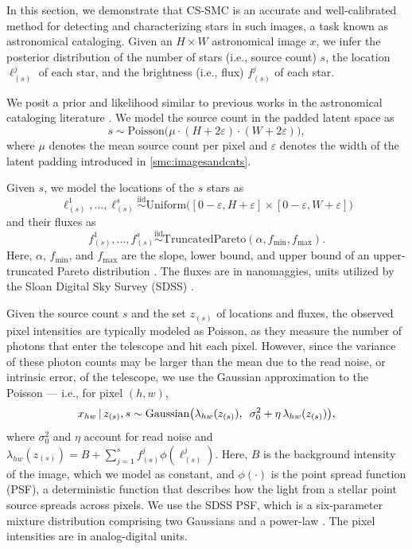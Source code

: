 \documentclass[
  12pt]{article}
\newcommand{\padvert}{\thinspace \vert \thinspace}
\begin{document}
In this section, we demonstrate that CS-SMC is an accurate and well-calibrated method for detecting and characterizing stars in such images, a task known as astronomical cataloging. Given an ${H{\times}W}$ astronomical image $x$, we infer the posterior distribution of the number of stars (i.e., source count) $s$, the location $\ell_{(s)}^j$ of each star, and the brightness (i.e., flux) $f_{(s)}^j$ of each star.

We posit a prior and likelihood similar to previous works in the astronomical cataloging literature \citep{brewer2013probabilistic, portillo2017improved, feder2020multiband}. We model the source count in the padded latent space as
\begin{equation*}
    s \sim \text{Poisson}\bigl(\mu \cdot (H + 2\varepsilon) \cdot (W + 2\varepsilon)\bigr),
\end{equation*}
where $\mu$ denotes the mean source count per pixel and $\varepsilon$ denotes the width of the latent padding introduced in \autoref{smc:imagesandcats}.

Given $s$, we model the locations of the $s$ stars as
\begin{equation*}
    \ell_{(s)}^1,...,\ell_{(s)}^s \overset{\text{iid}}{\sim} \text{Uniform}\bigl([0{-}\varepsilon,H{+}\varepsilon] {\times} [0{-}\varepsilon,W{+}\varepsilon]\bigr)
\end{equation*}
and their fluxes as
\begin{equation*}
    f_{(s)}^1,...,f_{(s)}^s \overset{\text{iid}}{\sim} \text{TruncatedPareto}(\alpha, f_{\min}, f_{\max}).
\end{equation*}
Here, $\alpha$, $f_{\min}$, and $f_{\max}$ are the slope, lower bound, and upper bound of an upper-truncated Pareto distribution \citep{aban2006parameter}. The fluxes are in nanomaggies, units utilized by the Sloan Digital Sky Survey (SDSS) \citep{an2008galactic}.

Given the source count $s$ and the set $z_{(s)}$ of locations and fluxes, the observed pixel intensities are typically modeled as Poisson, as they measure the number of photons that enter the telescope and hit each pixel. However, since the variance of these photon counts may be larger than the mean due to the read noise, or intrinsic error, of the telescope, we use the Gaussian approximation to the Poisson — i.e., for pixel $(h,w)$,
\begin{equation*}
    x_{hw} \padvert z_{(s)}, s \sim \text{Gaussian}\bigl(\lambda_{hw}(z_{(s)}), \enspace \sigma_0^2 + \eta \thinspace \lambda_{hw}(z_{(s)})\bigr),
\end{equation*}
where $\sigma_0^2$ and $\eta$ account for read noise and $\lambda_{hw}(z_{(s)}) = B + \sum_{j=1}^s f_{(s)}^j \phi(\ell_{(s)}^j)$. Here, $B$ is the background intensity of the image, which we model as constant, and $\phi(\cdot)$ is the point spread function (PSF), a deterministic function that describes how the light from a stellar point source spreads across pixels. We use the SDSS PSF, which is a six-parameter mixture distribution comprising two Gaussians and a power-law \citep{xin2018study}. The pixel intensities are in analog-digital units.
\end{document}
